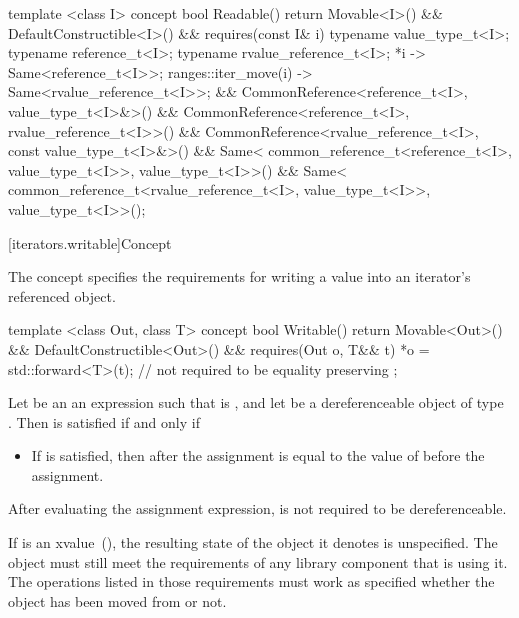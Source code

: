 %
\begin{codeblock}
  template <class I>
  concept bool Readable() {
    return Movable<I>() && DefaultConstructible<I>() &&
      requires(const I& i) {
        typename value_type_t<I>;
        typename reference_t<I>;
        typename rvalue_reference_t<I>;
        { *i } -> Same<reference_t<I>>;
        { ranges::iter_move(i) } -> Same<rvalue_reference_t<I>>;
      } &&
      CommonReference<reference_t<I>, value_type_t<I>&>() &&
      CommonReference<reference_t<I>, rvalue_reference_t<I>>() &&
      CommonReference<rvalue_reference_t<I>, const value_type_t<I>&>() &&
      Same<
        common_reference_t<reference_t<I>, value_type_t<I>>,
        value_type_t<I>>() &&
      Same<
        common_reference_t<rvalue_reference_t<I>, value_type_t<I>>,
        value_type_t<I>>();
  }
\end{codeblock}

[iterators.writable]{Concept }

\pnum
The  concept specifies the requirements for writing a value into an iterator's
referenced object.

%
\begin{codeblock}
  template <class Out, class T>
  concept bool Writable() {
    return Movable<Out>() && DefaultConstructible<Out>() &&
      requires(Out o, T&& t) {
        *o = std::forward<T>(t); // not required to be equality preserving
      };
  }
\end{codeblock}

\pnum
Let  be an an expression such that  is , and let 
be a dereferenceable object of type . Then  is satisfied if and only if

\begin{itemize}
\item If  is satisfied,
then  after the assignment is equal
to the value of  before the assignment.
\end{itemize}

\pnum
After evaluating the assignment expression,  is not required to be dereferenceable.

\pnum
If  is an xvalue~(), the resulting
state of the object it denotes is unspecified. \enternote The object must still meet the
requirements of any library component that is using it. The operations listed
in those requirements must work as specified whether the object has been moved
from or not.\exitnote

